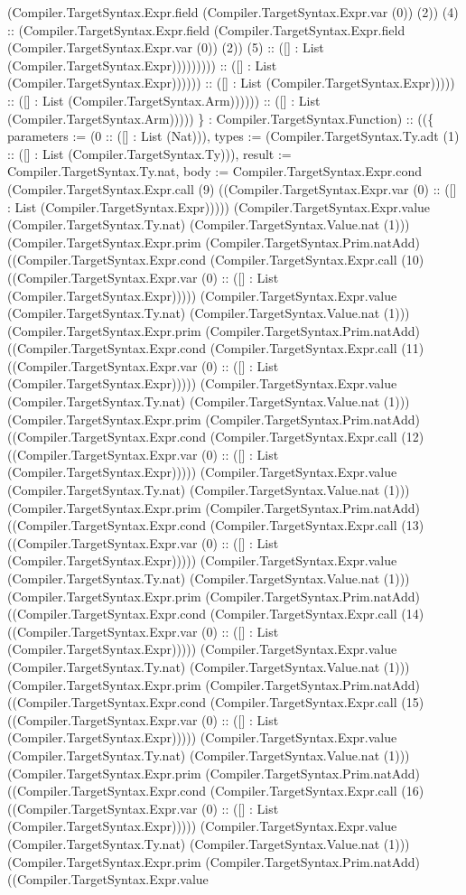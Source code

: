 \documentclass[11pt]{article}
\begin{document}
(Compiler.TargetSyntax.Expr.field (Compiler.TargetSyntax.Expr.var (0)) (2)) (4) :: (Compiler.TargetSyntax.Expr.field (Compiler.TargetSyntax.Expr.field (Compiler.TargetSyntax.Expr.var (0)) (2)) (5) :: ([] : List (Compiler.TargetSyntax.Expr))))))))) :: ([] : List (Compiler.TargetSyntax.Expr)))))) :: ([] : List (Compiler.TargetSyntax.Expr))))) :: ([] : List (Compiler.TargetSyntax.Arm)))))) :: ([] : List (Compiler.TargetSyntax.Arm))))) \} : Compiler.TargetSyntax.Function) :: ((\{ parameters := (0 :: ([] : List (Nat))), types := (Compiler.TargetSyntax.Ty.adt (1) :: ([] : List (Compiler.TargetSyntax.Ty))), result := Compiler.TargetSyntax.Ty.nat, body := Compiler.TargetSyntax.Expr.cond (Compiler.TargetSyntax.Expr.call (9) ((Compiler.TargetSyntax.Expr.var (0) :: ([] : List (Compiler.TargetSyntax.Expr))))) (Compiler.TargetSyntax.Expr.value (Compiler.TargetSyntax.Ty.nat) (Compiler.TargetSyntax.Value.nat (1))) (Compiler.TargetSyntax.Expr.prim (Compiler.TargetSyntax.Prim.natAdd) ((Compiler.TargetSyntax.Expr.cond (Compiler.TargetSyntax.Expr.call (10) ((Compiler.TargetSyntax.Expr.var (0) :: ([] : List (Compiler.TargetSyntax.Expr))))) (Compiler.TargetSyntax.Expr.value (Compiler.TargetSyntax.Ty.nat) (Compiler.TargetSyntax.Value.nat (1))) (Compiler.TargetSyntax.Expr.prim (Compiler.TargetSyntax.Prim.natAdd) ((Compiler.TargetSyntax.Expr.cond (Compiler.TargetSyntax.Expr.call (11) ((Compiler.TargetSyntax.Expr.var (0) :: ([] : List (Compiler.TargetSyntax.Expr))))) (Compiler.TargetSyntax.Expr.value (Compiler.TargetSyntax.Ty.nat) (Compiler.TargetSyntax.Value.nat (1))) (Compiler.TargetSyntax.Expr.prim (Compiler.TargetSyntax.Prim.natAdd) ((Compiler.TargetSyntax.Expr.cond (Compiler.TargetSyntax.Expr.call (12) ((Compiler.TargetSyntax.Expr.var (0) :: ([] : List (Compiler.TargetSyntax.Expr))))) (Compiler.TargetSyntax.Expr.value (Compiler.TargetSyntax.Ty.nat) (Compiler.TargetSyntax.Value.nat (1))) (Compiler.TargetSyntax.Expr.prim (Compiler.TargetSyntax.Prim.natAdd) ((Compiler.TargetSyntax.Expr.cond (Compiler.TargetSyntax.Expr.call (13) ((Compiler.TargetSyntax.Expr.var (0) :: ([] : List (Compiler.TargetSyntax.Expr))))) (Compiler.TargetSyntax.Expr.value (Compiler.TargetSyntax.Ty.nat) (Compiler.TargetSyntax.Value.nat (1))) (Compiler.TargetSyntax.Expr.prim (Compiler.TargetSyntax.Prim.natAdd) ((Compiler.TargetSyntax.Expr.cond (Compiler.TargetSyntax.Expr.call (14) ((Compiler.TargetSyntax.Expr.var (0) :: ([] : List (Compiler.TargetSyntax.Expr))))) (Compiler.TargetSyntax.Expr.value (Compiler.TargetSyntax.Ty.nat) (Compiler.TargetSyntax.Value.nat (1))) (Compiler.TargetSyntax.Expr.prim (Compiler.TargetSyntax.Prim.natAdd) ((Compiler.TargetSyntax.Expr.cond (Compiler.TargetSyntax.Expr.call (15) ((Compiler.TargetSyntax.Expr.var (0) :: ([] : List (Compiler.TargetSyntax.Expr))))) (Compiler.TargetSyntax.Expr.value (Compiler.TargetSyntax.Ty.nat) (Compiler.TargetSyntax.Value.nat (1))) (Compiler.TargetSyntax.Expr.prim (Compiler.TargetSyntax.Prim.natAdd) ((Compiler.TargetSyntax.Expr.cond (Compiler.TargetSyntax.Expr.call (16) ((Compiler.TargetSyntax.Expr.var (0) :: ([] : List (Compiler.TargetSyntax.Expr))))) (Compiler.TargetSyntax.Expr.value (Compiler.TargetSyntax.Ty.nat) (Compiler.TargetSyntax.Value.nat (1))) (Compiler.TargetSyntax.Expr.prim (Compiler.TargetSyntax.Prim.natAdd) ((Compiler.TargetSyntax.Expr.value 
\end{document}

